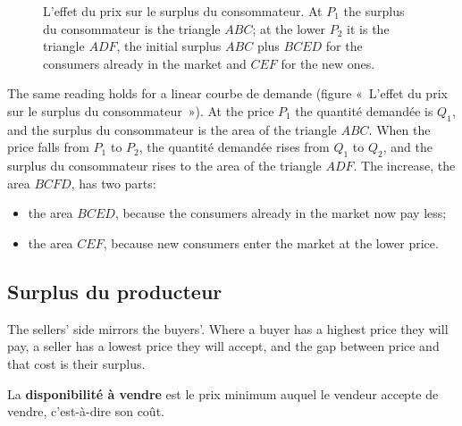 \begin{figure}[h!]
  \caption*{\small L'effet du prix sur le surplus du consommateur. At $P_1$ the
  surplus du consommateur is the triangle $ABC$; at the lower $P_2$ it is the
  triangle $ADF$, the initial surplus $ABC$ plus $BCED$ for the consumers already in
  the market and $CEF$ for the new ones.}
\end{figure}

The same reading holds for a linear courbe de demande (figure «~L'effet du prix sur
le surplus du consommateur~»). At the price $P_1$ the quantité demandée is $Q_1$, and
the surplus du consommateur is the area of the triangle $ABC$. When the price falls
from $P_1$ to $P_2$, the quantité demandée rises from $Q_1$ to $Q_2$, and the
surplus du consommateur rises to the area of the triangle $ADF$. The increase, the
area $BCFD$, has two parts:
\begin{itemize}
  \item the area $BCED$, because the consumers already in the market now pay less;
  \item the area $CEF$, because new consumers enter the market at the lower price.
\end{itemize}

\subsection{Surplus du producteur}

The sellers' side mirrors the buyers'. Where a buyer has a highest price they will
pay, a seller has a lowest price they will accept, and the gap between price and that
cost is their surplus.

\begin{definition}
  La \textbf{disponibilité à vendre} est le prix minimum auquel le vendeur accepte
  de vendre, c'est-à-dire son coût.
\end{definition}


